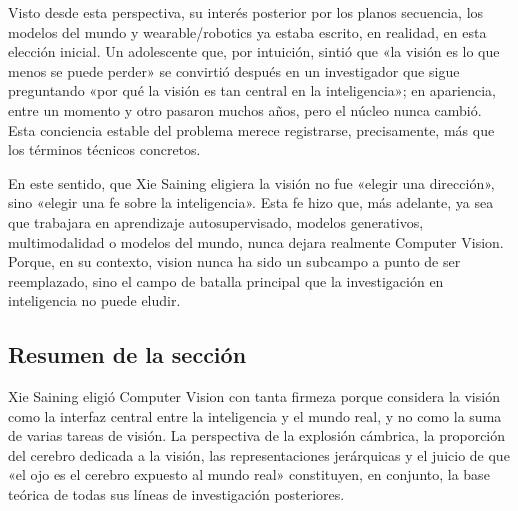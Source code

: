 Visto desde esta perspectiva, su interés posterior por los planos secuencia, los modelos del mundo y wearable/robotics ya estaba escrito, en realidad, en esta elección inicial. Un adolescente que, por intuición, sintió que «la visión es lo que menos se puede perder» se convirtió después en un investigador que sigue preguntando «por qué la visión es tan central en la inteligencia»; en apariencia, entre un momento y otro pasaron muchos años, pero el núcleo nunca cambió. Esta conciencia estable del problema merece registrarse, precisamente, más que los términos técnicos concretos.

En este sentido, que Xie Saining eligiera la visión no fue «elegir una dirección», sino «elegir una fe sobre la inteligencia». Esta fe hizo que, más adelante, ya sea que trabajara en aprendizaje autosupervisado, modelos generativos, multimodalidad o modelos del mundo, nunca dejara realmente Computer Vision. Porque, en su contexto, vision nunca ha sido un subcampo a punto de ser reemplazado, sino el campo de batalla principal que la investigación en inteligencia no puede eludir.

\subsection{Resumen de la sección}

Xie Saining eligió Computer Vision con tanta firmeza porque considera la visión como la interfaz central entre la inteligencia y el mundo real, y no como la suma de varias tareas de visión. La perspectiva de la explosión cámbrica, la proporción del cerebro dedicada a la visión, las representaciones jerárquicas y el juicio de que «el ojo es el cerebro expuesto al mundo real» constituyen, en conjunto, la base teórica de todas sus líneas de investigación posteriores.

